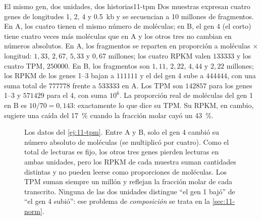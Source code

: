 \begin{ejemplo}{El mismo gen, dos unidades, dos historias}{11-tpm}
Dos muestras expresan cuatro genes de longitudes 1, 2, 4 y \SI{0,5}{kb} y se secuencian a 10 millones de fragmentos. En A, los cuatro tienen el mismo número de moléculas; en B, el gen 4 (el corto) tiene cuatro veces más moléculas que en A y los otros tres no cambian en números absolutos. En A, los fragmentos se reparten en proporción a moléculas $\times$ longitud: $1{,}33$, $2{,}67$, $5{,}33$ y $0{,}67$ millones; los cuatro RPKM valen $\num{133333}$ y los cuatro TPM, $\num{250000}$. En B, los fragmentos son $1{,}11$, $2{,}22$, $4{,}44$ y $2{,}22$ millones; los RPKM de los genes 1--3 bajan a $\num{111111}$ y el del gen 4 sube a $\num{444444}$, con una suma total de $\num{777778}$ frente a $\num{533333}$ en A. Los TPM son $\num{142857}$ para los genes 1--3 y $\num{571429}$ para el 4, con suma $10^6$. La proporción real de moléculas del gen 1 en B es $10/70=0{,}143$: exactamente lo que dice su TPM. Su RPKM, en cambio, sugiere una caída del \SI{17}{\percent} cuando la fracción molar cayó un \SI{43}{\percent}.
\end{ejemplo}

\begin{figure}[t]
\centering
{}
\caption[RPKM frente a TPM]{Los datos del \cref{ej:11-tpm}. Entre A y B, solo el gen 4 cambió su número absoluto de moléculas (se multiplicó por cuatro). Como el total de lecturas es fijo, los otros tres genes pierden lecturas en ambas unidades, pero los RPKM de cada muestra suman cantidades distintas y no pueden leerse como proporciones de moléculas. Los TPM suman siempre un millón y reflejan la fracción molar de cada transcrito. Ninguna de las dos unidades distingue ``el gen 1 bajó'' de ``el gen 4 subió'': ese problema de \emph{composición} se trata en la \cref{sec:11-norm}.}
\label{fig:11-tpm}
\end{figure}

